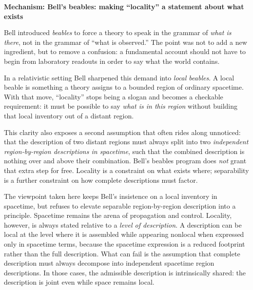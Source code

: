 \documentclass[11pt,twoside,openright]{book}
\newenvironment{mechanismbox}[1]
  {\begin{framed}\noindent\textbf{Mechanism: #1}\par\medskip}
  {\end{framed}}
\begin{document}
\begin{mechanismbox}{Bell's beables: making ``locality'' a statement about what exists}
Bell introduced \emph{beables} to force a theory to speak in the grammar of \emph{what is there}, not in the grammar of ``what is observed.''
The point was not to add a new ingredient, but to remove a confusion: a fundamental account should not have to begin from laboratory readouts in order to say what the world contains.

In a relativistic setting Bell sharpened this demand into \emph{local beables}. A local beable is something a theory assigns to a bounded region of ordinary spacetime. With that move, ``locality'' stops being a slogan and becomes a checkable requirement: it must be possible to say \emph{what is in this region} without building that local inventory out of a distant region.

This clarity also exposes a second assumption that often rides along unnoticed: that the description of two distant regions must always split into two \emph{independent region-by-region descriptions in spacetime}, such that the combined description is nothing over and above their combination. Bell's beables program does \emph{not} grant that extra step for free. Locality is a constraint on what exists where; separability is a further constraint on how complete descriptions must factor.

The viewpoint taken here keeps Bell's insistence on a local inventory in spacetime, but refuses to elevate separable region-by-region description into a principle.
Spacetime remains the arena of propagation and control.
Locality, however, is always stated relative to a \emph{level of description}. A description can be local at the level where it is assembled while appearing nonlocal when expressed only in spacetime terms, because the spacetime expression is a reduced footprint rather than the full description.
What can fail is the assumption that complete description must always decompose into independent spacetime region descriptions.
In those cases, the admissible description is intrinsically shared: the description is joint even while space remains local.
\end{mechanismbox}
\end{document}
